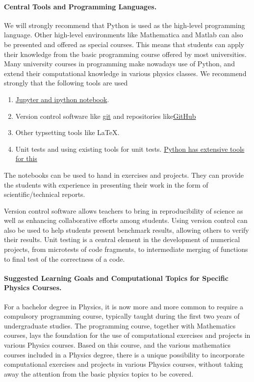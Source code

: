 \documentclass[graybox,envcountchap,sectrefs]{svmult}
\begin{document}
\paragraph{Central Tools and Programming Languages.}
We will strongly recommend that Python is used as the high-level
 programming language. Other high-level environments like Mathematica
 and Matlab can also be presented and offered as special courses. This
 means that students can apply their knowledge from the basic programming course offered by most universities.
Many university courses in programming  make nowadays use of Python, and extend their computational knowledge in
 various physics classes. We recommend strongly that the following
 tools are used 
\begin{enumerate}
\item \href{{http://jupyter.org/}}{Jupyter and ipython notebook}.  

\item Version control software like \href{{https://git-scm.com/}}{git} and repositories like\href{{https://github.com/}}{GitHub} 

\item Other typsetting tools like {\LaTeX}.

\item Unit tests and using existing tools for unit tests. \href{{https://docs.python.org/2/library/unittest.html}}{Python has extensive tools for this}
\end{enumerate}

\noindent
The notebooks can be used to hand in exercises and projects. They can provide the students with experience in presenting their work in the form of scientific/technical reports.

Version control software allows teachers to bring in reproducibility of science as well as enhancing
collaborative efforts among students. Using version control can also be used to help students present benchmark results, allowing others to 
verify their results. Unit testing is a central element in the development of numerical projects, from microtests of code fragments, to intermediate merging of functions to final test of the correctness of a code.

\paragraph{Suggested Learning Goals and Computational Topics for Specific Physics Courses.}
For a bachelor degree in Physics, it is now more and more common to require a compulsory
programming course, typically taught during the first two years of
undergraduate studies. The programming course, together with
Mathematics courses, lays the foundation for the use of computational
exercises and projects in various Physics courses. Based on this
course, and the various mathematics courses included in a Physics
degree, there is a unique possibility to incorporate computational
exercises and projects in various Physics courses, without taking away
the attention from the basic physics topics to be covered.
\end{document}
